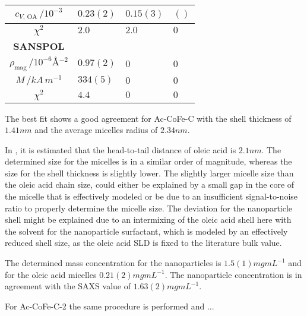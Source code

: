 \documentclass[\main/dresen_thesis.tex]{subfiles}
\begin{document}
\begin{table}[ht]
\begin{tabular}{ c | l | l | l }
          \rule{0pt}{2ex} $c_{V, \, \mathrm{OA}} \, / \unit{10^{-3}}$      & $0.23(2)$ & $0.15(3)$  & $()$\\
          \hline
          \rule{0pt}{2ex} $\chi^2$                                          & $2.0$      & $2.0$    & $0$\\
          \hline
          \textbf{SANSPOL}\\
          \hline
          \rule{0pt}{2ex} $\rho_\mathrm{mag} \, / \unit{10^{-6} \angstrom^{-2}}$   & $0.97(2)$    & $0$ & $0$\\
          \rule{0pt}{2ex} $M \, / \unit{kA \,m^{-1}}$                       & $334(5)$     & $0$ & $0$\\
          \hline
          \rule{0pt}{2ex} $\chi^2$                                          & $4.4$          & $0$        & $0$\\
        \end{tabular}
      \end{table}

      The best fit shows a good agreement for Ac-CoFe-C with the shell thickness of $1.41 \unit{nm}$ and the average micelles radius of $2.34 \unit{nm}$.

      In \cite{Disch_2010_Thesp}, it is estimated that the head-to-tail distance of oleic acid is $2.1 \unit{nm}$.
      The determined size for the micelles is in a similar order of magnitude, whereas the size for the shell thickness is slightly lower.
      The slightly larger micelle size than the oleic acid chain size, could either  be explained by a small gap in the core of the micelle that is effectively modeled or be due to an insufficient signal-to-noise ratio to properly determine the micelle size.
      The deviation for the nanoparticle shell might be explained due to an intermixing of the oleic acid shell here with the solvent for the nanoparticle surfactant, which is modeled by an effectively reduced shell size, as the oleic acid SLD is fixed to the literature bulk value.

      The determined mass concentration for the nanoparticles is $1.5(1) \unit{mg mL^{-1}}$ and for the oleic acid micelles $0.21(2) \unit{mg mL^{-1}}$.
      The nanoparticle concentration is in agreement with the SAXS value of $1.63(2) \unit{mg mL^{-1}}$.

      For Ac-CoFe-C-2 the same procedure is performed and ...
\end{document}
